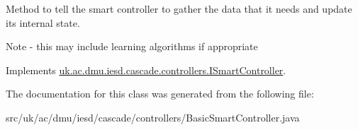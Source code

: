Method to tell the smart controller to gather the data that it needs and update its internal state. 

Note -\/ this may include learning algorithms if appropriate 

Implements \hyperlink{interfaceuk_1_1ac_1_1dmu_1_1iesd_1_1cascade_1_1controllers_1_1_i_smart_controller_afc5d7e6516ec865dbb4e94d62b114440}{uk.\-ac.\-dmu.\-iesd.\-cascade.\-controllers.\-I\-Smart\-Controller}.



The documentation for this class was generated from the following file\-:\begin{DoxyCompactItemize}
\item 
src/uk/ac/dmu/iesd/cascade/controllers/Basic\-Smart\-Controller.\-java\end{DoxyCompactItemize}
